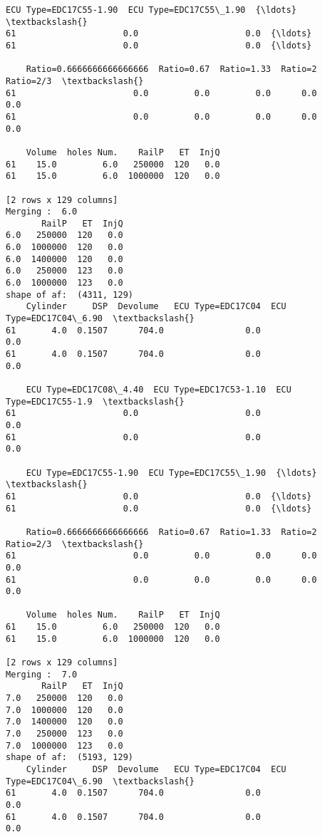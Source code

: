 \documentclass[11pt]{article}
\begin{document}
\begin{Verbatim}[commandchars=\\\{\}]
    ECU Type=EDC17C55-1.90  ECU Type=EDC17C55\_1.90  {\ldots}   \textbackslash{}
61                     0.0                     0.0  {\ldots}    
61                     0.0                     0.0  {\ldots}    

    Ratio=0.6666666666666666  Ratio=0.67  Ratio=1.33  Ratio=2  Ratio=2/3  \textbackslash{}
61                       0.0         0.0         0.0      0.0        0.0   
61                       0.0         0.0         0.0      0.0        0.0   

    Volume  holes Num.    RailP   ET  InjQ  
61    15.0         6.0   250000  120   0.0  
61    15.0         6.0  1000000  120   0.0  

[2 rows x 129 columns]
Merging :  6.0
       RailP   ET  InjQ
6.0   250000  120   0.0
6.0  1000000  120   0.0
6.0  1400000  120   0.0
6.0   250000  123   0.0
6.0  1000000  123   0.0
shape of af:  (4311, 129)
    Cylinder     DSP  Devolume   ECU Type=EDC17C04  ECU Type=EDC17C04\_6.90  \textbackslash{}
61       4.0  0.1507      704.0                0.0                     0.0   
61       4.0  0.1507      704.0                0.0                     0.0   

    ECU Type=EDC17C08\_4.40  ECU Type=EDC17C53-1.10  ECU Type=EDC17C55-1.9  \textbackslash{}
61                     0.0                     0.0                    0.0   
61                     0.0                     0.0                    0.0   

    ECU Type=EDC17C55-1.90  ECU Type=EDC17C55\_1.90  {\ldots}   \textbackslash{}
61                     0.0                     0.0  {\ldots}    
61                     0.0                     0.0  {\ldots}    

    Ratio=0.6666666666666666  Ratio=0.67  Ratio=1.33  Ratio=2  Ratio=2/3  \textbackslash{}
61                       0.0         0.0         0.0      0.0        0.0   
61                       0.0         0.0         0.0      0.0        0.0   

    Volume  holes Num.    RailP   ET  InjQ  
61    15.0         6.0   250000  120   0.0  
61    15.0         6.0  1000000  120   0.0  

[2 rows x 129 columns]
Merging :  7.0
       RailP   ET  InjQ
7.0   250000  120   0.0
7.0  1000000  120   0.0
7.0  1400000  120   0.0
7.0   250000  123   0.0
7.0  1000000  123   0.0
shape of af:  (5193, 129)
    Cylinder     DSP  Devolume   ECU Type=EDC17C04  ECU Type=EDC17C04\_6.90  \textbackslash{}
61       4.0  0.1507      704.0                0.0                     0.0   
61       4.0  0.1507      704.0                0.0                     0.0   


\end{Verbatim}
\end{document}
